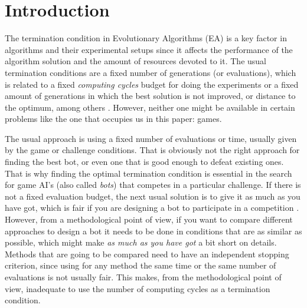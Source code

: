\documentclass[runningheads,a4paper]{llncs}
\begin{document}
\section{Introduction}

The termination condition in Evolutionary Algorithms (EA) is a key
factor in algorithms and their experimental setups since it affects the performance of
the algorithm solution and the amount of resources devoted to it. The
usual termination conditions are a fixed number of generations (or
evaluations), 
which is related to a fixed {\em computing cycles}
budget for doing the experiments or a fixed amount of generations in
which the best solution is not improved, or distance to the optimum,
among others \cite{RocheTermination13}. However, neither one might be
available in certain problems like the one that occupies us in this
paper: games. 

The usual approach is using a fixed number of evaluations or time,
usually given by the game or challenge conditions. That is obviously
not the right approach for finding the best bot, or even one that is
good enough to defeat existing ones. That is why finding the optimal termination condition is essential in the search for
game AI's (also called \textit{bots}) that competes in a particular
challenge. If there is not a fixed evaluation budget, the next usual solution is to give
it as much as you have got, which is fair if you are designing a bot %
to participate in a competition \cite{DBLP:conf/cec/Fernandez-AresMGGF11}. However, from a methodological point
of view, if you want to compare different approaches to design a bot
it needs to be done in conditions that are as similar as possible, which %
might make {\em as much as you have got} a bit short on
details. Methods that are going to be compared need to have an %
independent stopping criterion, since using for any method the same
time or the same number of evaluations is not usually fair. This
makes, from the methodological point of view, inadequate to use the
number of computing cycles as a termination condition. 
 
\end{document}
